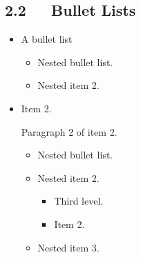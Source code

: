 \documentclass[10pt,english]{article}
\begin{document}
\subsection*{2.2~~~Bullet Lists}
\begin{itemize}
\item {} 
A bullet list
\begin{itemize}
\item {} 
Nested bullet list.

\item {} 
Nested item 2.

\end{itemize}

\item {} 
Item 2.

Paragraph 2 of item 2.
\begin{itemize}
\item {} 
Nested bullet list.

\item {} 
Nested item 2.
\begin{itemize}
\item {} 
Third level.

\item {} 
Item 2.

\end{itemize}

\item {} 
Nested item 3.

\end{itemize}

\end{itemize}



\hypertarget{enumerated-lists}{}
\end{document}
